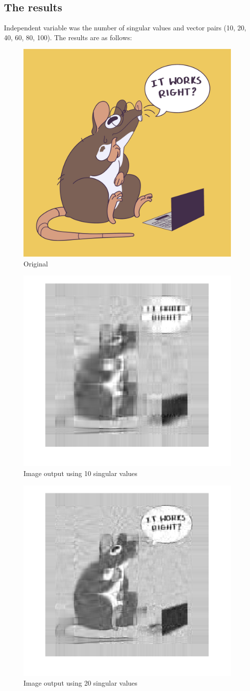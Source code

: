 \subsection*{The results}
Independent variable was the number of singular values and vector pairs (10, 20, 40, 60, 80, 100). The results are as follows:
\begin{figure}[h]
    \centering
    \includegraphics[width=0.5\linewidth]{figs/student_rat.png}
    \caption{Original}
    \label{fig:orginal}
\end{figure}
\begin{figure}[h]
    \centering
    \includegraphics[width=0.5\linewidth]{figs/10_s_v.png}
    \caption{Image output using 10 singular values}
    \label{fig:10_s}
\end{figure}
\begin{figure}[h]
    \centering
    \includegraphics[width=0.5\linewidth]{figs/20_s_v.png}
    \caption{Image output using 20 singular values}
    \label{fig:20_s}
\end{figure}

